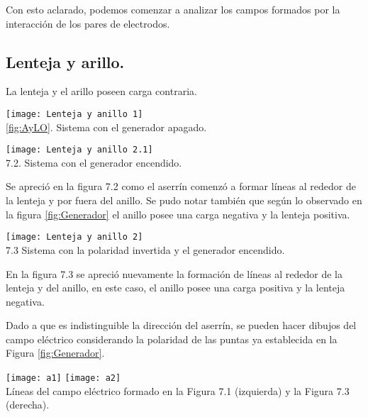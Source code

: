 \documentclass[10pt]{article}
\begin{document}
\begin{multicols}{2}
	Con esto aclarado, podemos comenzar a analizar los campos formados por la interacción de los pares de electrodos.


	\subsection{Lenteja y arillo.}



	La lenteja y el arillo poseen carga contraria.

	\begin{center}
		\texttt{[image: Lenteja y anillo 1]}\\

		\ref{fig:AyLO}. Sistema con el generador apagado.
		\label{fig:AyLO}
	\end{center}


	\begin{center}
		\centering
		\texttt{[image: Lenteja y anillo 2.1]}\\

		7.2. Sistema con el generador encendido.
		\label{fig:AyLE1}
	\end{center}

	Se apreció en la figura 7.2 como el aserrín comenzó a formar líneas al rededor de la lenteja y por fuera del anillo. Se pudo notar también que según lo observado en la figura \ref{fig:Generador} el anillo posee una carga negativa y la lenteja positiva.


	\begin{center}
		\texttt{[image: Lenteja y anillo 2]}\\
		7.3 Sistema con la polaridad invertida y el generador encendido.
		\label{fig:AyLE2}
	\end{center}

	En la figura 7.3 se apreció nuevamente la formación de líneas al rededor de la lenteja y del anillo, en este caso, el anillo posee una carga positiva y la lenteja negativa.

	Dado a que es indistinguible la dirección del aserrín, se pueden hacer dibujos del campo eléctrico considerando la polaridad de las puntas ya establecida en la Figura \ref{fig:Generador}.

	\begin{center}
		\texttt{[image: a1]}
		\texttt{[image: a2]}\\

		Líneas del campo eléctrico formado en la Figura 7.1 (izquierda) y la Figura 7.3 (derecha).
	\end{center}



\end{multicols}
\end{document}
